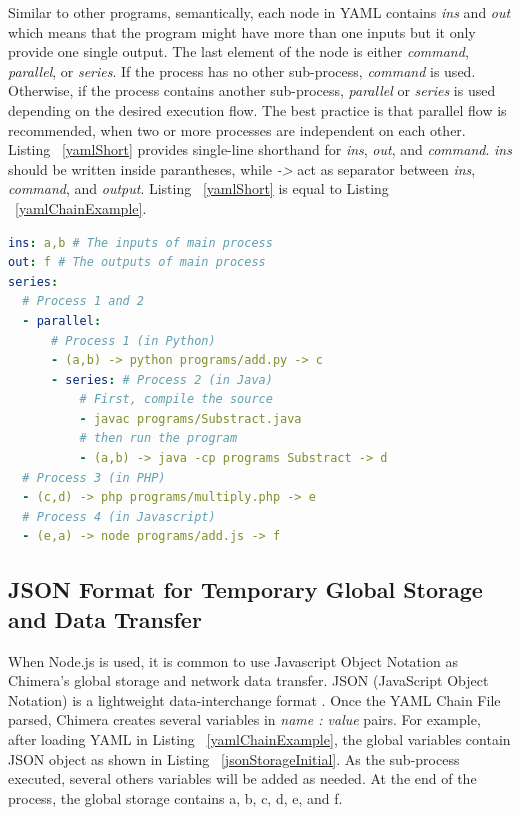 \documentclass[conference]{IEEEtran}
\begin{document}
Similar to other programs, semantically, each node in YAML contains {\it ins} and {\it out } which means that the program might have more than one inputs but it only provide one single output. 
The last element of the node is either {\it command}, {\it parallel}, or {\it series}. 
If the process has no other sub-process, {\it command} is used. Otherwise, if the
process contains another sub-process, {\it parallel} or {\it series} is used depending
on the desired execution flow. The best practice is that parallel flow is recommended, when two or more processes
are independent on each other. Listing  ~\ref{yamlShort} provides single-line shorthand for {\it ins}, {\it out}, 
and {\it command}. {\it ins} should be written inside parantheses, while {\it ->}
act as separator between {\it ins}, {\it command}, and {\it output}. 
Listing  ~\ref{yamlShort} is equal to Listing ~\ref{yamlChainExample}.

\begin{lstlisting}[caption=YAML Chain With Shorthand, label=yamlShort, language=yaml, basicstyle=\small, breaklines=true]
ins: a,b # The inputs of main process 
out: f # The outputs of main process 
series:
  # Process 1 and 2 
  - parallel:
      # Process 1 (in Python) 
      - (a,b) -> python programs/add.py -> c
      - series: # Process 2 (in Java) 
          # First, compile the source  
          - javac programs/Substract.java
          # then run the program 
          - (a,b) -> java -cp programs Substract -> d
  # Process 3 (in PHP) 
  - (c,d) -> php programs/multiply.php -> e
  # Process 4 (in Javascript) 
  - (e,a) -> node programs/add.js -> f
\end{lstlisting}


\subsection{JSON Format for Temporary Global Storage and Data Transfer}

When Node.js is used, it is common to use Javascript Object Notation as Chimera's
global storage and network data transfer. JSON (JavaScript Object Notation) is a 
lightweight data-interchange format \cite{json}. Once the YAML Chain File parsed, Chimera creates several variables in {\it name : 
value} pairs. For example, after loading YAML in Listing ~\ref{yamlChainExample}, the
global variables contain JSON object as shown in Listing ~\ref{jsonStorageInitial}. As the sub-process executed, several others variables will be added as needed. At the
end of the process, the global storage contains a, b, c, d, e, and f.
\end{document}
